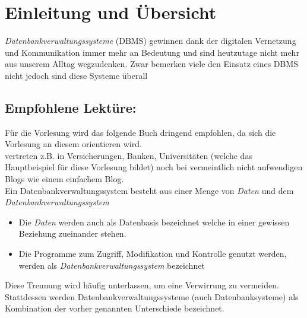 \chapter{Einleitung und Übersicht}
\textit{Datenbankverwaltungssysteme} (DBMS) gewinnen dank der digitalen Vernetzung und Kommunikation immer mehr an Bedeutung und sind heutzutage nicht mehr aus unserem Alltag wegzudenken. Zwar bemerken viele den Einsatz eines DBMS nicht jedoch sind diese Systeme überall

\section{Empfohlene Lektüre:}
Für die Vorlesung wird das folgende Buch dringend empfohlen, da sich die Vorlesung an diesem orientieren wird. \\ vertreten z.B. in Versicherungen, Banken, Universitäten (welche das Hauptbeispiel für diese Vorlesung bildet) noch bei vermeintlich nicht aufwendigen Blogs wie einem einfachem Blog.\\
Ein Datenbankverwaltungssystem besteht aus einer Menge von \textit{Daten} und dem \textit{Datenbankverwaltungssystem} 
\begin{itemize}
	\item Die \textit{Daten} werden auch als Datenbasis bezeichnet welche in einer gewissen Beziehung zueinander stehen. 
	\item Die Programme zum Zugriff, Modifikation und Kontrolle genutzt werden, werden als \textit{Datenbankverwaltungssystem} bezeichnet
\end{itemize}
Diese Trennung wird häufig unterlassen, um eine Verwirrung zu vermeiden. Stattdessen werden Datenbankverwaltungssysteme (auch Datenbanksysteme) als Kombination der vorher genannten Unterschiede bezeichnet. 

